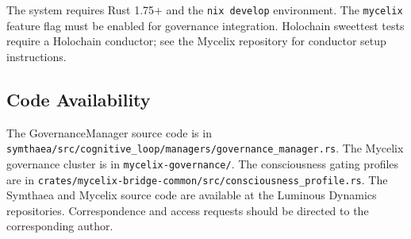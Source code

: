 \documentclass[11pt,a4paper]{article}
\begin{document}
The system requires Rust 1.75+ and the \texttt{nix develop} environment. The \texttt{mycelix} feature flag must be enabled for governance integration. Holochain sweettest tests require a Holochain conductor; see the Mycelix repository for conductor setup instructions.

\subsection*{Code Availability}

The GovernanceManager source code is in \texttt{symthaea/src/cognitive\_loop/managers/governance\_manager.rs}. The Mycelix governance cluster is in \texttt{mycelix-governance/}. The consciousness gating profiles are in \texttt{crates/mycelix-bridge-common/src/consciousness\_profile.rs}. The Symthaea and Mycelix source code are available at the Luminous Dynamics repositories. Correspondence and access requests should be directed to the corresponding author.



\end{document}

